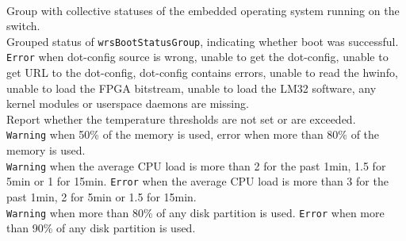    {\\
    Group with collective statuses of the embedded operating system running on
    the switch.}
   {\\
    Grouped status of \texttt{wrsBootStatusGroup}, indicating whether boot was
    successful. \texttt{Error} when dot-config source is wrong, unable to get
    the dot-config, unable to get URL to the dot-config, dot-config contains
    errors, unable to read the hwinfo, unable to load the FPGA bitstream, unable
    to load the LM32 software, any kernel modules or userspace daemons are
    missing.}
   {\\
    Report whether the temperature thresholds are not set or are exceeded.}
   {\\
    \texttt{Warning} when 50\% of the memory is used, error when more than 80\%
    of the memory is used.}
   {\\
    \texttt{Warning} when the average CPU load is more than 2 for the past 1min,
    1.5 for 5min or 1 for 15min. \texttt{Error} when the average CPU load is
    more than 3 for the past 1min, 2 for 5min or 1.5 for 15min.}
	 {\\
    \texttt{Warning} when more than 80\% of any disk partition is used.
    \texttt{Error} when more than 90\% of any disk partition is used.}


